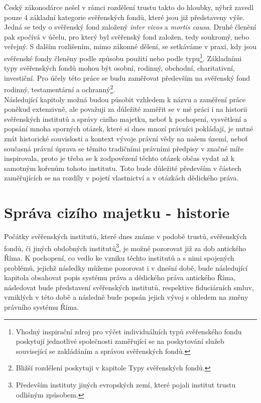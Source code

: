 \documentclass{article}
\begin{document}
Český zákonodárce nešel v rámci rozdělení trustu takto do hloubky, nýbrž zavedl pouze 4 základní kategorie svěřenských fondů, které jsou již představeny výše. Jedná se tedy o svěřenský fond založený \textit{inter vivos} a \textit{mortis causa}. Druhé členění pak spočívá v účelu, pro který byl svěřenský fond založen, tedy soukromý, nebo veřejný. S dalším rozlišením, mimo zákonné dělení, se setkáv\-áme v praxi, kdy jsou svěřenské fondy členěny podle způsobu použití nebo podle typu\footnote{Vhodný inspirační zdroj pro výčet individuálních typů svěřenského fondu poskytují jednotlivé společnosti zaměřující se na poskytování služeb související se zakládáním a správou svěřenských fondů.}. Základními typy svěřenských fondů mohou být osobní, rodinný, obchodní, charitativní, investiční. Pro účely této práce se budu zaměřovat především na svěřenský fond rodinný, testamentární a ochranný\footnote{Bližší rozdělení poskytuji v kapitole Typy svěřenských fondů.}.\\

Následující kapitoly možná budou působit vzhledem k názvu a zaměření práce poněkud extenzivně, ale považuji za důležité zaměřit se v mé práci i na historii svěřenských institutů a správy cizího majetku, neboť k pochopení, vysvětlení a popsání mnoha sporných otázek, které si dnes mnozí právníci pokládají, je nutné znát historické souvislosti a kontext vývoje právní vědy na našem území, neboť současná právní úprava se těmito tradičními právními předpisy v značné míře inspirovala, proto je třeba se k zodpovězení těchto otázek občas vydat až k samotným kořenům tohoto institutu. Toto bude důležité především v částech zaměřujících se na rozdíly v pojetí vlastnictví a v otázkách dědického práva.\\


\newpage

\section{Správa cizího majetku - historie}

Počátky svěřenských institutů, které dnes známe v podobě trustů, svěřenských fondů, či jiných obdobných institutů\footnote{Především instituty jiných evropských zemí, které pojali institut trustu odlišným způsobem.}, je možné pozorovat již za dob antického Říma. K pochopení, co vedlo ke vzniku těchto institutů a s nimi spojených problémů, jejichž následky můžeme pozorovat i v dnešní době, bude následující kapitola obsahovat popis systému práva a dědického práva antického Říma, následovat bude představení svěřenských institutů, respektive fiduciárních s\-mluv, vzniklých v této době a následně bude popsán jejich vývoj s ohledem na změny právního systému Říma.
\end{document}
